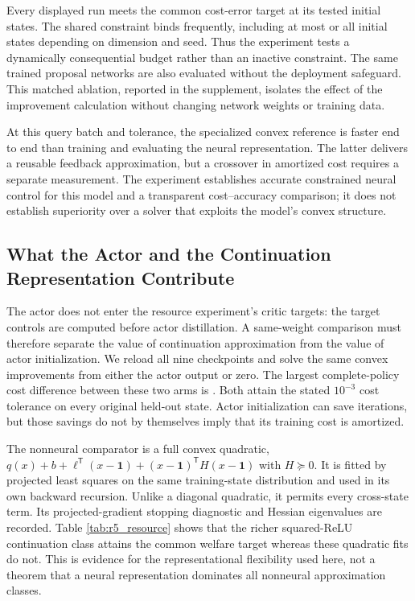 Every displayed run meets the common cost-error target at its tested initial states. The shared constraint binds frequently, including at most or all initial states depending on dimension and seed. Thus the experiment tests a dynamically consequential budget rather than an inactive constraint. The same trained proposal networks are also evaluated without the deployment safeguard. This matched ablation, reported in the supplement, isolates the effect of the improvement calculation without changing network weights or training data.

At this query batch and tolerance, the specialized convex reference is faster end to end than training and evaluating the neural representation. The latter delivers a reusable feedback approximation, but a crossover in amortized cost requires a separate measurement. The experiment establishes accurate constrained neural control for this model and a transparent cost--accuracy comparison; it does not establish superiority over a solver that exploits the model's convex structure.

\subsection{What the Actor and the Continuation Representation Contribute}
The actor does not enter the resource experiment's critic targets: the target controls are computed before actor distillation. A same-weight comparison must therefore separate the value of continuation approximation from the value of actor initialization. We reload all nine checkpoints and solve the same convex improvements from either the actor output or zero. The largest complete-policy cost difference between these two arms is \NBOActorEquality{}. Both attain the stated $10^{-3}$ cost tolerance on every original held-out state. Actor initialization can save iterations, but those savings do not by themselves imply that its training cost is amortized.

The nonneural comparator is a full convex quadratic, $q(x)+b+\ell^\mathsf T(x-\mathbf1)+(x-\mathbf1)^\mathsf TH(x-\mathbf1)$ with $H\succeq0$. It is fitted by projected least squares on the same training-state distribution and used in its own backward recursion. Unlike a diagonal quadratic, it permits every cross-state term. Its projected-gradient stopping diagnostic and Hessian eigenvalues are recorded. Table \ref{tab:r5_resource} shows that the richer squared-ReLU continuation class attains the common welfare target whereas these quadratic fits do not. This is evidence for the representational flexibility used here, not a theorem that a neural representation dominates all nonneural approximation classes.


